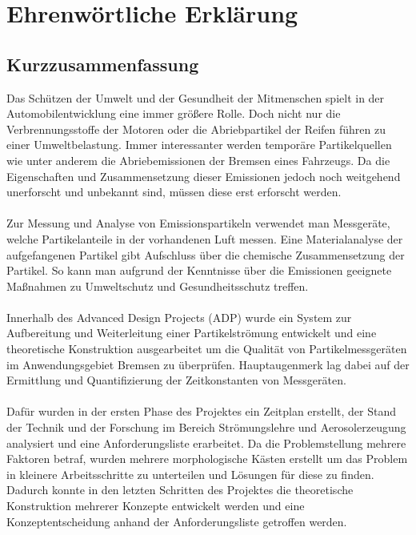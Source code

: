 \documentclass[longdoc,accentcolor=tud1b,11pt,paper=a4]{tudreport}
\title{\fzdTitle}
\subtitle{\fzdThesisType \fzdID}
\begin{document}
	\frenchspacing
	\raggedbottom
	\maketitle
	
	\chapter*{Ehrenw\"{o}rtliche Erkl\"{a}rung}
	
	\newpage	
	
	\section*{Kurzzusammenfassung}
Das Sch\"{u}tzen der Umwelt und der Gesundheit der Mitmenschen spielt in der Automobilentwicklung eine immer gr\"{o}{\ss}ere Rolle. Doch nicht nur die Verbrennungsstoffe der Motoren oder die Abriebpartikel der Reifen f\"{u}hren zu einer Umweltbelastung. Immer interessanter werden tempor\"{a}re Partikelquellen wie unter anderem die Abriebemissionen der Bremsen eines Fahrzeugs. Da die Eigenschaften und Zusammensetzung dieser Emissionen jedoch noch weitgehend unerforscht und unbekannt sind, m\"{u}ssen diese erst erforscht werden. 
	\\
	\\
Zur Messung und Analyse von Emissionspartikeln verwendet man Messger\"{a}te, welche Partikelanteile in der vorhandenen Luft messen. Eine Materialanalyse der aufgefangenen Partikel gibt Aufschluss \"{u}ber die chemische Zusammensetzung der Partikel. So kann man aufgrund der Kenntnisse \"{u}ber die Emissionen geeignete Ma{\ss}nahmen zu Umweltschutz und Gesundheitsschutz treffen.
	\\
	\\
Innerhalb des Advanced Design Projects (ADP) wurde ein System zur Aufbereitung und Weiterleitung einer Partikelstr\"{o}mung entwickelt und eine theoretische Konstruktion ausgearbeitet um die Qualit\"{a}t von Partikelmessger\"{a}ten im Anwendungsgebiet Bremsen zu \"{u}berpr\"{u}fen. Hauptaugenmerk lag dabei auf der Ermittlung und Quantifizierung der Zeitkonstanten von Messger\"{a}ten.
	\\
	\\
Daf\"{u}r wurden in der ersten Phase des Projektes ein Zeitplan erstellt, der Stand der Technik und der Forschung im Bereich Str\"{o}mungslehre und Aerosolerzeugung analysiert und eine Anforderungsliste erarbeitet. Da die Problemstellung mehrere Faktoren betraf, wurden mehrere morphologische K\"{a}sten erstellt um das Problem in kleinere Arbeitsschritte zu unterteilen und L\"{o}sungen f\"{u}r diese zu finden. Dadurch konnte in den letzten Schritten des Projektes die theoretische Konstruktion mehrerer Konzepte entwickelt werden und eine Konzeptentscheidung anhand der Anforderungsliste getroffen werden.
\end{document}

